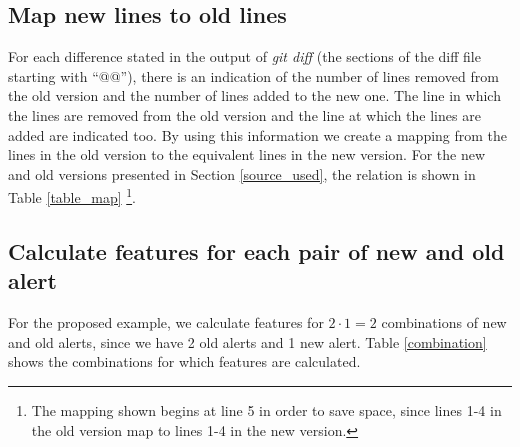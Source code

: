 \documentclass[
]{article}
\begin{document}
\normalsize

\subsection{Map new lines to old lines}\label{map}

For each difference stated in the output of \textit{git diff} (the sections of
the diff file starting with ``@@''), there is an indication of the
number of lines removed from the old version and the number of lines
added to the new one. The line in which the lines are removed from the
old version and the line at which the lines are added are indicated
too. By using this information we create a mapping from
the lines in the old version to the equivalent lines in the new
version. For the new and old versions presented in Section
\ref{source_used}, the relation is shown in Table \ref{table_map} \footnote{The mapping shown begins at line 5 in order to save space, since lines 1-4 in the old version map to lines 1-4 in the new version.}.

\small

\begin{table}[H]

\caption{\label{tab:showing map }Mapping between lines of the old version and lines of the new version\label{table_map}}
\centering
{}
\end{table}

\normalsize

\subsection{Calculate features for each pair of new and old alert}

For the proposed example, we calculate
features for \(2 \cdot 1 = 2\) combinations of new and old alerts, since
we have 2 old alerts and 1 new alert. Table \ref{combination} shows the
combinations for which features are calculated.
\end{document}
